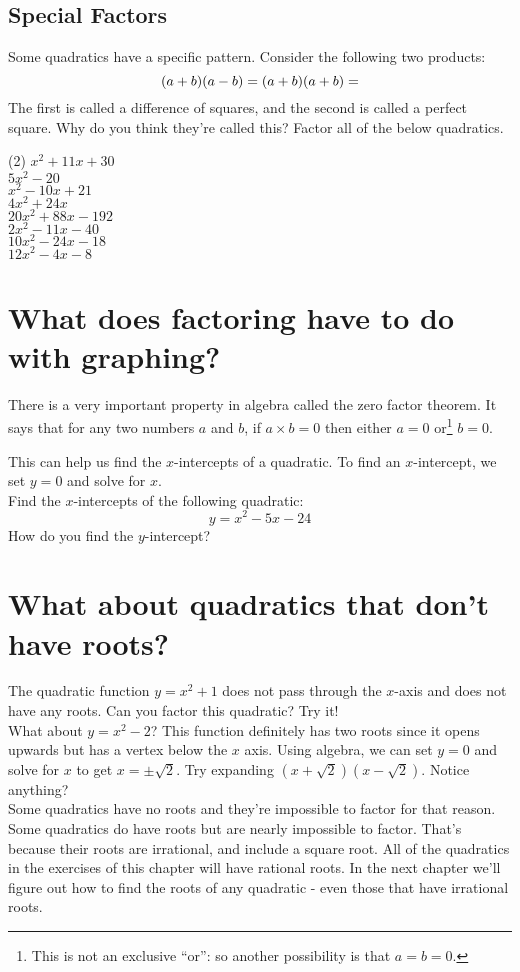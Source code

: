 \documentclass[12pt,fleqn]{book}
\begin{document}
\subsection*{Special Factors}
Some quadratics have a specific pattern.  Consider the following two products:
\[
    (a+b)(a-b) = 
    \hfill 
    (a+b)(a+b) =
    \hfill 
\]
The first is called a difference of squares, and the second is called a perfect square.  Why do you think they're called this?
\vfill 
Factor all of the below quadratics.
\begin{tasks}(2)
	\task $x^2+11x + 30$\\[2em]
	\task $5x^2 - 20 $\\[2em]
	\task $x^2-10x +21 $\\[2em]
	\task $4x^2 + 24x $\\[2em]
	\task $20x^2+88x-192 $\\[2em]
	\task $2x^2 -11x -40 $\\[2em]
	\task $10x^2 -24x -18 $\\[2em]
	\task $12x^2-4x-8$\\[2em]
\end{tasks}
\section*{What does factoring have to do with graphing?}
There is a very important property in algebra called the zero factor theorem.  It says that for any two numbers $a$ and $b$, if $a\times b = 0$ then either $a=0$ or\footnote{This is not an exclusive ``or'': so another possibility is that $a=b=0$.} $b=0$.

This can help us find the $x$-intercepts of a quadratic.  To find an $x$-intercept, we set $y=0$ and solve for $x$.
\\[1em]
Find the $x$-intercepts of the following quadratic:
\[y=x^2-5x-24\]
\vfill How do you find the $y$-intercept?
\\[1in]
\clearpage
\section*{What about quadratics that don't have roots?}
The quadratic function $y=x^2+1$ does not pass through the $x$-axis and does not have any roots.  Can you factor this quadratic?  Try it!
\\[4em]
What about $y=x^2 - 2$?  This function definitely has two roots since it opens upwards but has a vertex below the $x$ axis.  Using algebra, we can set $y=0$ and solve for $x$ to get $x=\pm \sqrt 2$.  Try expanding $(x+\sqrt 2)(x-\sqrt 2)$.  Notice anything?
\\[4em]
Some quadratics have no roots and they're impossible to factor for that reason.  Some quadratics do have roots but are nearly impossible to factor.  That's because their roots are irrational, and include a square root.  All of the quadratics in the exercises of this chapter will have rational roots.  In the next chapter we'll figure out how to find the roots of any quadratic - even those that have irrational roots.
\end{document}
